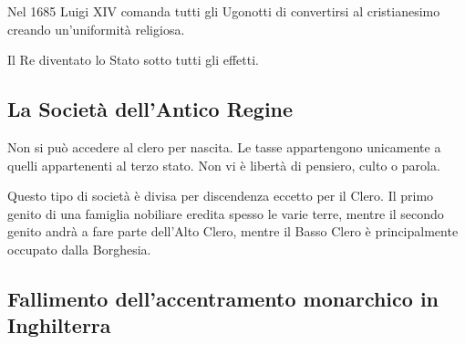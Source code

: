 \documentclass[a4paper]{article}
\begin{document}
Nel 1685 Luigi XIV comanda tutti gli Ugonotti di convertirsi al cristianesimo creando
un'uniformità religiosa.

Il Re diventato lo Stato sotto tutti gli effetti.

\subsection{La Società dell'Antico Regine}

\begin{center}
\end{center}

Non si può accedere al clero per nascita.
Le tasse appartengono unicamente a quelli appartenenti al terzo stato.
Non vi è libertà di pensiero, culto o parola.

Questo tipo di società è divisa per discendenza eccetto per il Clero.
Il primo genito di una famiglia nobiliare eredita spesso le varie terre, mentre il secondo genito
andrà a fare parte dell'Alto Clero, mentre il Basso Clero è principalmente occupato dalla Borghesia.

\subsection{Fallimento dell'accentramento monarchico in Inghilterra}
\end{document}
